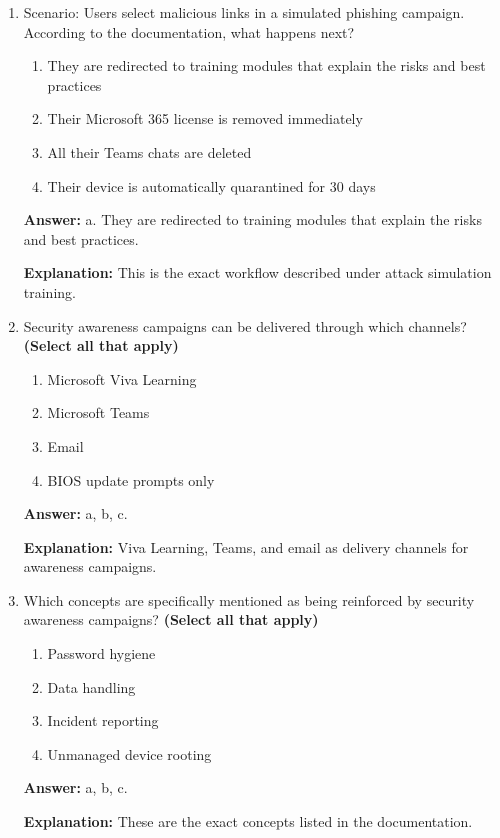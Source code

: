 \documentclass[10pt]{article}
\begin{document}
\begin{enumerate}[leftmargin=*]
\textbf{Explanation:} these simulations mimic real-world attacks like credential harvesting or business email compromise.

\item Scenario: Users select malicious links in a simulated phishing campaign. According to the documentation, what happens next?
\begin{enumerate}[label=\alph*., leftmargin=1.5em]
\item They are redirected to training modules that explain the risks and best practices
\item Their Microsoft 365 license is removed immediately
\item All their Teams chats are deleted
\item Their device is automatically quarantined for 30 days
\end{enumerate}
\textbf{Answer:} a. They are redirected to training modules that explain the risks and best practices.

\textbf{Explanation:} This is the exact workflow described under attack simulation training.

\item Security awareness campaigns can be delivered through which channels? \textbf{(Select all that apply)}
\begin{enumerate}[label=\alph*., leftmargin=1.5em]
\item Microsoft Viva Learning
\item Microsoft Teams
\item Email
\item BIOS update prompts only
\end{enumerate}
\textbf{Answer:} a, b, c.

\textbf{Explanation:} Viva Learning, Teams, and email as delivery channels for awareness campaigns.

\item Which concepts are specifically mentioned as being reinforced by security awareness campaigns? \textbf{(Select all that apply)}
\begin{enumerate}[label=\alph*., leftmargin=1.5em]
\item Password hygiene
\item Data handling
\item Incident reporting
\item Unmanaged device rooting
\end{enumerate}
\textbf{Answer:} a, b, c.

\textbf{Explanation:} These are the exact concepts listed in the documentation.


\end{enumerate}
\end{document}
